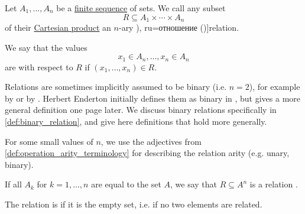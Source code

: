 \begin{definition}\label{def:relation}
  Let \( A_1, \ldots, A_n \) be a \hyperref[def:sequence]{finite sequence} of sets. We call any subset
  \begin{equation*}
    R \subseteq A_1 \times \cdots \times A_n
  \end{equation*}
  of their \hyperref[def:cartesian_product]{Cartesian product} an \( n \)-ary \term[bg=релация (\cite[367]{ГеновМиховскиМоллов1991Алгебра}), ru=отношение (\cite[25]{КолмогоровДрагалин2006Логика})]{relation}.

  We say that the values
  \begin{equation*}
    x_1 \in A_n, \ldots, x_n \in A_n
  \end{equation*}
  are  with respect to \( R \) if \( (x_1, \ldots, x_n) \in R \).

  Relations are sometimes implicitly assumed to be binary (i.e. \( n = 2 \)), for example by  or by . Herbert Enderton initially defines them as binary in , but gives a more general definition one page later. We discuss binary relations specifically in \cref{def:binary_relation}, and give here definitions that hold more generally.

  \begin{thmenum}[series=def:relation]
     For some small values of \( n \), we use the adjectives from \cref{def:operation_arity_terminology} for describing the relation arity (e.g. unary, binary).

     If all \( A_k \) for \( k = 1, \ldots, n \) are equal to the set \( A \), we say that \( R \subseteq A^n \) is a relation .

     The relation is  if it is the empty set, i.e. if no two elements are related.
  \end{thmenum}
\end{definition}

